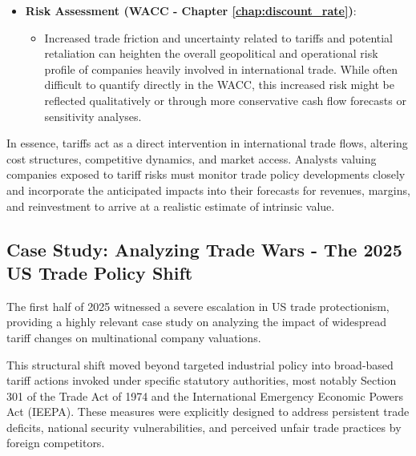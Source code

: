 \begin{itemize}
    \item \textbf{Risk Assessment (WACC - Chapter \ref{chap:discount_rate})}:
          \begin{itemize}
              \item Increased trade friction and uncertainty related to tariffs and potential retaliation can heighten the overall geopolitical and operational risk profile of companies heavily involved in international trade. While often difficult to quantify directly in the WACC, this increased risk might be reflected qualitatively or through more conservative cash flow forecasts or sensitivity analyses.
          \end{itemize}
\end{itemize}

In essence, tariffs act as a direct intervention in international trade flows, altering cost structures, competitive dynamics, and market access. Analysts valuing companies exposed to tariff risks must monitor trade policy developments closely and incorporate the anticipated impacts into their forecasts for revenues, margins, and reinvestment to arrive at a realistic estimate of intrinsic value.

\subsection{Case Study: Analyzing Trade Wars - The 2025 US Trade Policy Shift} \label{subsec:case_study_tradewar}

The first half of 2025 witnessed a severe escalation in US trade protectionism, providing a highly relevant case study on analyzing the impact of widespread tariff changes on multinational company valuations.

This structural shift moved beyond targeted industrial policy into broad-based tariff actions invoked under specific statutory authorities, most notably Section 301 of the Trade Act of 1974 and the International Emergency Economic Powers Act (IEEPA). These measures were explicitly designed to address persistent trade deficits, national security vulnerabilities, and perceived unfair trade practices by foreign competitors.

